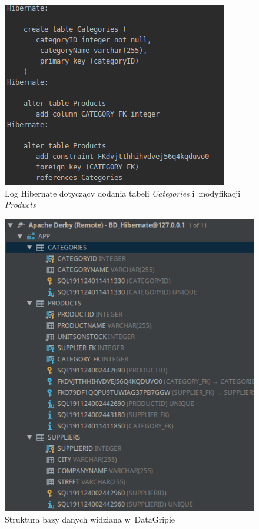 \documentclass[12pt, a4paper]{mwart}
\begin{document}
\begin{figure}[ht]
  \centering
  \includegraphics[scale=0.80]{VI/6-1.png}
  \caption{Log Hibernate dotyczący dodania tabeli \textit{Categories} i~modyfikacji \textit{Products}}
  \label{rys:6.1}
\end{figure}

\begin{figure}[ht]
  \centering
  \includegraphics[scale=0.60]{VI/6-4.png}
  \caption{Struktura bazy danych widziana w~DataGripie}
  \label{rys:6.4}
\end{figure}
\end{document}
